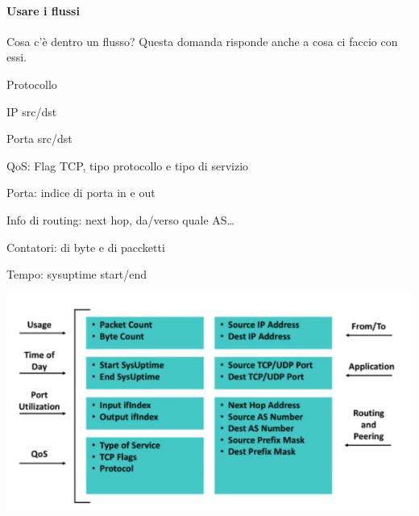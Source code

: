 \documentclass[10pt]{book}
\begin{document}
\begin{multicols}{2}
\paragraph{Usare i flussi} Cosa c'è dentro un flusso? Questa domanda risponde anche a cosa ci faccio con essi.
\begin{list}{}{Nella parte di chiave: la quintupletta}
	\item Protocollo
	\item IP src/dst
	\item Porta src/dst
\end{list}
\begin{list}{}{Altre info}
	\item QoS: Flag TCP, tipo protocollo e tipo di servizio
	\item Porta: indice di porta in e out
	\item Info di routing: next hop, da/verso quale AS\ldots
	\item Contatori: di byte e di paccketti
	\item Tempo: sysuptime start/end
\end{list}
\columnbreak
\begin{center}
	\includegraphics[scale=0.6]{useflows.png}
\end{center}
\end{multicols}
\end{document}
